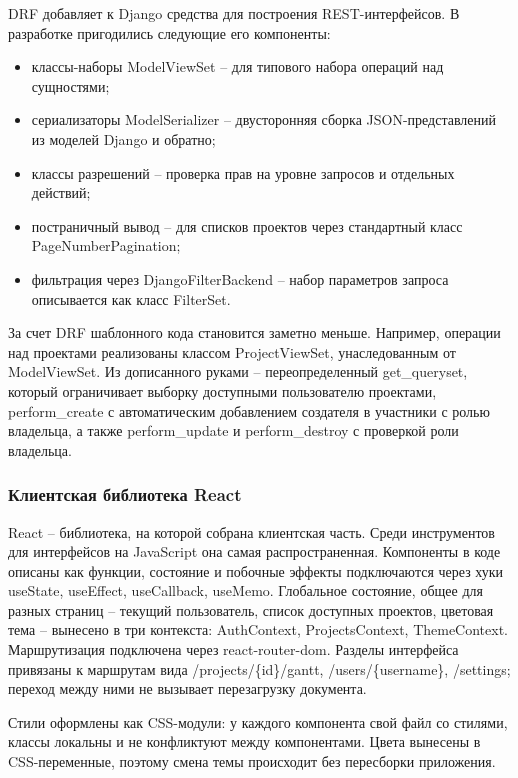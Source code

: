DRF добавляет к Django средства для построения REST-интерфейсов. В разработке пригодились следующие его компоненты:
\begin{itemize}
    \item классы-наборы ModelViewSet -- для типового набора операций над сущностями;
    \item сериализаторы ModelSerializer -- двусторонняя сборка JSON-представлений из моделей Django и обратно;
    \item классы разрешений -- проверка прав на уровне запросов и отдельных действий;
    \item постраничный вывод -- для списков проектов через стандартный класс PageNumberPagination;
    \item фильтрация через DjangoFilterBackend -- набор параметров запроса описывается как класс FilterSet.
\end{itemize}

За счет DRF шаблонного кода становится заметно меньше. Например, операции над проектами реализованы классом ProjectViewSet, унаследованным от ModelViewSet. Из дописанного руками -- переопределенный get\_queryset, который ограничивает выборку доступными пользователю проектами, perform\_create с автоматическим добавлением создателя в участники с ролью владельца, а также perform\_update и perform\_destroy с проверкой роли владельца.

\subsubsection{Клиентская библиотека React}

React \cite{react_docs} -- библиотека, на которой собрана клиентская часть. Среди инструментов для интерфейсов на JavaScript она самая распространенная. Компоненты в коде описаны как функции, состояние и побочные эффекты подключаются через хуки useState, useEffect, useCallback, useMemo. Глобальное состояние, общее для разных страниц -- текущий пользователь, список доступных проектов, цветовая тема -- вынесено в три контекста: AuthContext, ProjectsContext, ThemeContext. Маршрутизация подключена через react-router-dom. Разделы интерфейса привязаны к маршрутам вида /projects/\{id\}/gantt, /users/\{username\}, /settings; переход между ними не вызывает перезагрузку документа.

Стили оформлены как CSS-модули: у каждого компонента свой файл со стилями, классы локальны и не конфликтуют между компонентами. Цвета вынесены в CSS-переменные, поэтому смена темы происходит без пересборки приложения.

